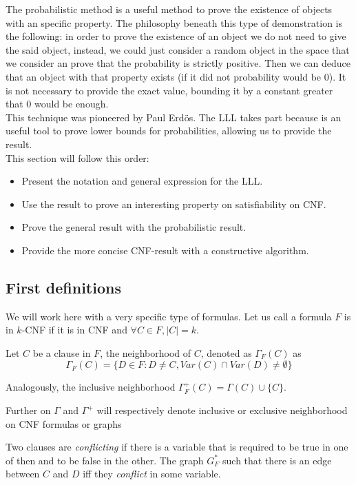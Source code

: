 The probabilistic method is a useful method to prove the existence of objects with an specific property. The philosophy beneath this type of demonstration is the following: in order to prove the existence of an object we do not need to give the said object, instead, we could just consider a random object in the space that we consider an prove that the probability is strictly positive. Then we can deduce that an object with that property exists (if it did not probability would be 0). It is not necessary to provide the exact value, bounding it by a constant greater that 0 would be enough. \\

This technique was pioneered by Paul Erdös. The LLL takes part because is an useful tool to prove lower bounds for probabilities, allowing us to provide the result.\\

This section will follow this order:
\begin{itemize}
	\item Present the notation and general expression for the LLL.
	\item Use the result to prove an interesting property on satisfiability on CNF.
	\item Prove the general result with the probabilistic result.
	\item Provide the more concise CNF-result with a constructive algorithm.
\end{itemize}


\subsection{First definitions}

We will work here with a very specific type of formulas. Let us call a formula $F$ is in $k$-CNF
if it is in CNF and $\forall C \in F, |C| = k$.
\begin{definition}
	Let $C$ be a clause in $F$, the neighborhood of $C$, denoted as $\Gamma_F(C)$ as 
	$$ \Gamma_F(C) = \{ D \in F : D\ne C, Var(C) \cap Var(D) \ne \emptyset\}$$
	
	Analogously, the inclusive neighborhood $\Gamma_F^+(C) = \Gamma(C) \cup \{C\}$. 
\end{definition}


Further on $\Gamma$ and $\Gamma^+$ will respectively denote inclusive or exclusive neighborhood on CNF formulas or graphs


\begin{definition}
	
	Two clauses are \emph{conflicting} if there is a variable that is required to be true in one of then and to be false in the other. The graph $G_F^*$ such that there is an edge between $C$ and $D$ iff they \emph{conflict} in some variable.
	
\end{definition}
	



